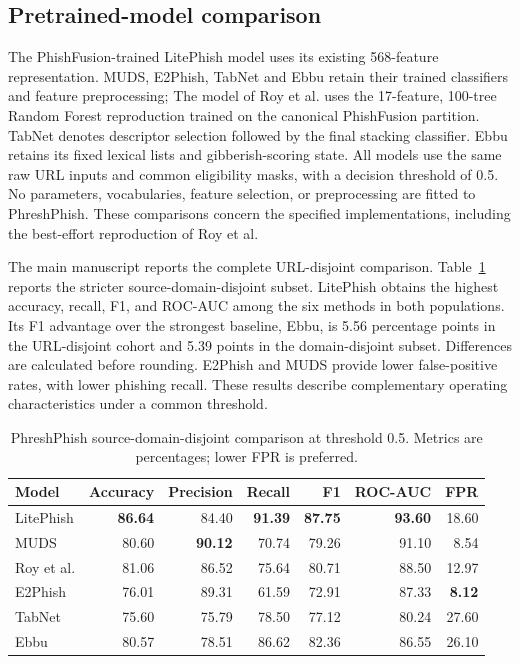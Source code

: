 \documentclass[10pt]{article}
\newenvironment{bluechange}{\color{black}}{}
\begin{document}
\begin{bluechange}
\subsection{Pretrained-model comparison}
The PhishFusion-trained LitePhish model uses its existing 568-feature representation. MUDS, E2Phish, TabNet and Ebbu retain their trained classifiers and feature preprocessing; The model of Roy et al. uses the 17-feature, 100-tree Random Forest reproduction trained on the canonical PhishFusion partition. TabNet denotes descriptor selection followed by the final stacking classifier. Ebbu retains its fixed lexical lists and gibberish-scoring state. All models use the same raw URL inputs and common eligibility masks, with a decision threshold of 0.5. No parameters, vocabularies, feature selection, or preprocessing are fitted to PhreshPhish. These comparisons concern the specified implementations, including the best-effort reproduction of Roy et al.

The main manuscript reports the complete URL-disjoint comparison. Table~\ref{tab:phresh_domain} reports the stricter source-domain-disjoint subset. LitePhish obtains the highest accuracy, recall, F1, and ROC-AUC among the six methods in both populations. Its F1 advantage over the strongest baseline, Ebbu, is 5.56 percentage points in the URL-disjoint cohort and 5.39 points in the domain-disjoint subset. Differences are calculated before rounding. E2Phish and MUDS provide lower false-positive rates, with lower phishing recall. These results describe complementary operating characteristics under a common threshold.

\begin{table}[!ht]
\centering\small\color{black}
\caption{\color{black}PhreshPhish source-domain-disjoint comparison at threshold 0.5. Metrics are percentages; lower FPR is preferred.}
\label{tab:phresh_domain}
\begin{tabular}{lrrrrrr}
\toprule
Model & Accuracy & Precision & Recall & F1 & ROC-AUC & FPR \\
\midrule
LitePhish & \textbf{86.64} & 84.40 & \textbf{91.39} & \textbf{87.75} & \textbf{93.60} & 18.60 \\
MUDS & 80.60 & \textbf{90.12} & 70.74 & 79.26 & 91.10 & 8.54 \\
Roy et al. & 81.06 & 86.52 & 75.64 & 80.71 & 88.50 & 12.97 \\
E2Phish & 76.01 & 89.31 & 61.59 & 72.91 & 87.33 & \textbf{8.12} \\
TabNet & 75.60 & 75.79 & 78.50 & 77.12 & 80.24 & 27.60 \\
Ebbu & 80.57 & 78.51 & 86.62 & 82.36 & 86.55 & 26.10 \\
\bottomrule
\end{tabular}
\end{table}


\end{bluechange}
\end{document}
